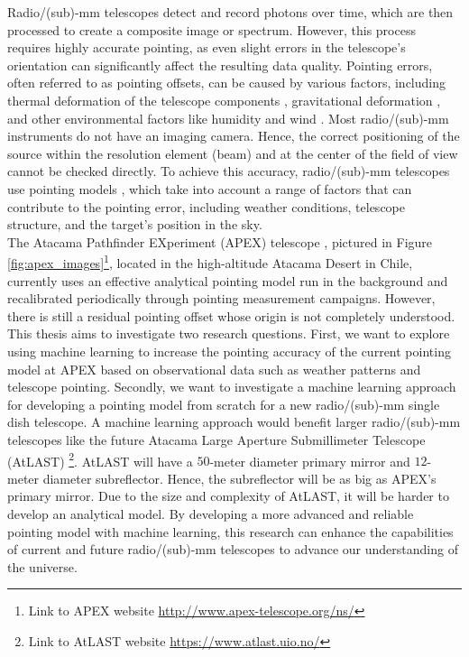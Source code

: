 Radio/(sub)-mm telescopes detect and record photons over time, which are then processed to create a composite image or spectrum.
However, this process requires highly accurate pointing, as even slight errors in the telescope's orientation can significantly affect the resulting data quality.
Pointing errors, often referred to as pointing offsets, can be caused by various factors, including thermal deformation of the telescope components \cite{Dong2018},
gravitational deformation \cite{GravDeformation}, and other environmental factors like humidity \cite{Corstanje2017} and wind \cite{Gawronski2005}.
Most radio/(sub)-mm instruments do not have an imaging camera.
Hence, the correct positioning of the source within the resolution element (beam) and at the center of the field of view cannot be checked directly.
To achieve this accuracy, radio/(sub)-mm telescopes use pointing models \cite{stumpff1972}, which take into account a range of factors that can contribute to the pointing error,
including weather conditions, telescope structure, and the target's position in the sky.\\

The Atacama Pathfinder EXperiment (APEX) telescope \cite{APEX2006}, pictured in Figure \ref{fig:apex_images}\footnote[1]{Link to APEX website \href{http://www.apex-telescope.org/ns/}{http://www.apex-telescope.org/ns/}}, located in the high-altitude Atacama Desert in Chile,
currently uses an effective analytical pointing model run in the background and recalibrated periodically through pointing measurement campaigns.
However, there is still a residual pointing offset whose origin is not completely understood.
This thesis aims to investigate two research questions.
First, we want to explore using machine learning to increase the pointing accuracy of the current pointing model at APEX based on observational data such as weather patterns and telescope pointing.
Secondly, we want to investigate a machine learning approach for developing a pointing model from scratch for a new radio/(sub)-mm single dish telescope.
A machine learning approach would benefit larger radio/(sub)-mm telescopes like the future Atacama Large Aperture Submillimeter Telescope (AtLAST)
\footnote[2]{Link to AtLAST website \href{https://www.atlast.uio.no/}{https://www.atlast.uio.no/}}.
AtLAST will have a $50$-meter diameter primary mirror and $12$-meter diameter subreflector. Hence, the subreflector will be as big as APEX's primary mirror.
Due to the size and complexity of AtLAST, it will be harder to develop an analytical model.
By developing a more advanced and reliable pointing model with machine learning,
this research can enhance the capabilities of current and future radio/(sub)-mm telescopes to advance our understanding of the universe.


